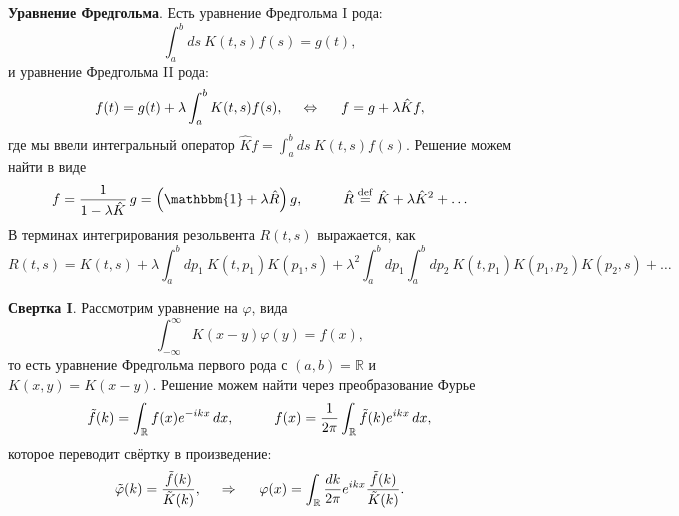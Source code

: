 





\textbf{Уравнение Фредгольма}. Есть уравнение Фредгольма I рода:
\begin{equation*}
	\int_{a}^{b} ds\ K(t, s) f(s) = g(t),
\end{equation*}
и уравнение Фредгольма II рода:
\begin{equation}
	f(t) = g(t) + \lambda \int_{a}^{b} K(t, s) f(s),
	\hspace{5 mm} \Leftrightarrow \hspace{5 mm} 
	f = g + \lambda \hat{K} f,
	\label{Feq2}
\end{equation}
где мы ввели интегральный оператор $\hat{K} f = \int_{a}^{b} ds \ K(t, s) f(s)$. Решение можем найти в виде
\begin{equation*}
	f = \frac{1}{1-\lambda \hat{K}}\,  g = \left(\mathbbm{1} + \lambda \hat{R}\right) g,
	\hspace{10 mm} 
	\hat{R} \overset{\mathrm{def}}{=}  \hat{K} + \lambda \hat{K}^2 + \ldots
\end{equation*}
В терминах интегрирования резольвента $R (t, s)$ выражается, как
\begin{equation}
	R(t,s) = K(t, s) + \lambda \int_{a}^{b}d p_1\  K(t, p_1) K(p_1, s) + 
	\lambda^2 \int_{a}^{b} d p_1 \int_{a}^{b} d p_2 \ K(t, p_1) K(p_1, p_2) K(p_2, s) + \ldots
	\label{FeqRI}
\end{equation}





\textbf{Свертка I}. Рассмотрим уравнение на $\varphi$, вида
\begin{equation}
	\int_{-\infty}^{\infty} K(x-y) \varphi(y) = f(x),
\end{equation}
то есть уравнение Фредгольма первого рода с $(a, b) = \mathbb{R}$
 и $K(x,y) = K(x-y)$. 
Решение можем найти через преобразование Фурье 
\begin{equation*}
	\tilde{f}(k) = \int_{\mathbb{R}} f(x) e^{-ikx} \d x,
	\hspace{10 mm} 
	f(x) = \frac{1}{2 \pi}\int_{\mathbb{R}} \tilde{f} (k) e^{i k x} \d x,
\end{equation*}
которое переводит свёртку в произведение:
\begin{equation}
	\tilde{\varphi}(k) = \frac{\tilde{f}(k)}{\tilde{K}(k)},
	\hspace{0.5cm} \Rightarrow \hspace{0.5cm}
	 \varphi(x) = \int_{\mathbb{R}} \frac{dk}{2\pi} e^{ikx} \frac{\tilde{f}(k)}{\tilde{K}(k)}.
\end{equation}

